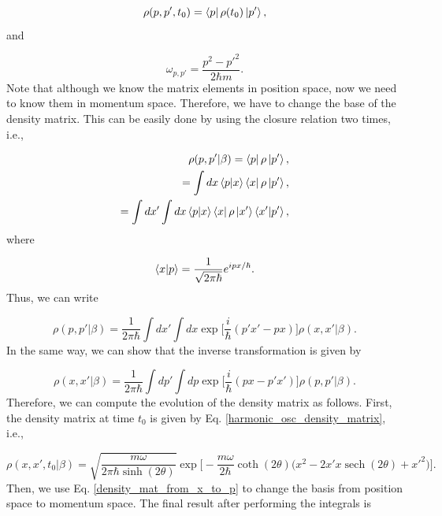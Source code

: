 \documentclass{article}
\DeclareMathOperator{\sech}{sech}
\begin{document}
\begin{equation}
    \rho(p,p',t_{0}) = \bra{p} \rho(t_{0}) \ket{p'},
\end{equation}
%
and

\begin{equation}\label{freq_omega_no_gravity}
    \omega_{p,p'} = \frac{p^{2}-p'^{2}}{2\hbar m}.
\end{equation}
%
Note that although we know the matrix elements in position space, now we need to know them in momentum space. Therefore, we have to change the base of the density matrix. This can be easily done by using the closure relation two times, i.e.,

\begin{equation}
    \begin{split}
        \rho(p,p'|\beta) = \bra{p} \rho \ket{p'}, \\ = \int dx \braket{p|x} \bra{x} \rho \ket{p'}, \\ =\int dx' \int dx \braket{p|x} \bra{x} \rho \ket{x'} \braket{x'|p'},
    \end{split}
\end{equation}
%
where

\begin{equation}
    \braket{x|p} = \frac{1}{\sqrt{2\pi \hbar}} e^{i px/\hbar}.
\end{equation}
%
Thus, we can write

\begin{equation}\label{density_mat_from_x_to_p}
    \rho(p,p'|\beta) = \frac{1}{2\pi \hbar} \int dx' \int dx \exp \bigg[ \frac{i}{\hbar} (p'x'-px) \bigg] \rho(x,x'|\beta).
\end{equation}
%
In the same way, we can show that the inverse transformation is given by

\begin{equation}\label{density_mat_from_p_to_x}
    \rho(x,x'|\beta) = \frac{1}{2\pi \hbar} \int dp' \int dp \exp \bigg[ \frac{i}{\hbar} (px-p'x') \bigg] \rho(p,p'|\beta).
\end{equation}
%
Therefore, we can compute the evolution of the density matrix as follows. First, the density matrix at time $t_{0}$ is given by Eq. \ref{harmonic_osc_density_matrix}, i.e.,

\begin{equation}
    \rho(x, x', t_{0}|\beta) = \sqrt{\frac{m\omega}{2\pi \hbar \sinh(2\theta)}} \exp \Bigg[ - \frac{m\omega}{2\hbar} \coth(2\theta) \big( x^{2} - 2x' x \sech(2\theta) + x'^{2} \big) \Big].
\end{equation}
%
Then, we use Eq. \ref{density_mat_from_x_to_p} to change the basis from position space to momentum space. The final result after performing the integrals is
\end{document}
